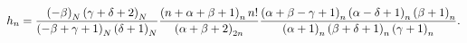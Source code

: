 \[h_{n}=\frac{\left(-\beta\right)_{N}\left(\gamma+\delta+2\right)_{N}}{\left(-%
\beta+\gamma+1\right)_{N}\left(\delta+1\right)_{N}}\frac{\left(n+\alpha+\beta+%
1\right)_{n}n!}{\left(\alpha+\beta+2\right)_{2n}}\*\frac{\left(\alpha+\beta-%
\gamma+1\right)_{n}\left(\alpha-\delta+1\right)_{n}\left(\beta+1\right)_{n}}{%
\left(\alpha+1\right)_{n}\left(\beta+\delta+1\right)_{n}\left(\gamma+1\right)_%
{n}}.\]
